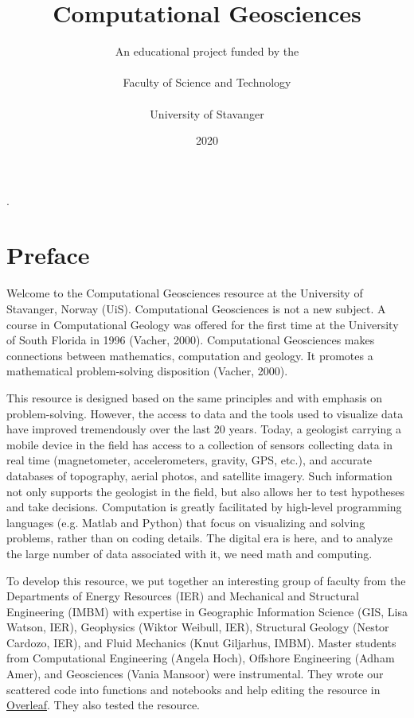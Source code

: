 \documentclass[a4paper , 12pt]{book}
\begin{document}

\lstset{style=mystyle}
\lstset{language=Python,upquote=true} %
\title{Computational Geosciences}
\author{An educational project funded by the \\ \\ Faculty of Science and Technology \\ \\ University of Stavanger}
\date{2020}

\setlength{\parindent}{0pt}.
\setlength{\parskip}{1em}
\renewcommand{\baselinestretch}{1.}

\maketitle
{}

\section*{Preface}

Welcome to the Computational Geosciences resource at the University of Stavanger, Norway (UiS). Computational Geosciences is not a new subject. A course in Computational Geology was offered for the first time at the University of South Florida in 1996 (Vacher, 2000). Computational Geosciences makes connections between mathematics, computation and geology. It promotes a mathematical problem-solving disposition (Vacher, 2000). 

This resource is designed based on the same principles and with emphasis on problem-solving. However, the access to data and the tools used to visualize data have improved tremendously over the last 20 years. Today, a geologist carrying a mobile device in the field has access to a collection of sensors collecting data in real time (magnetometer, accelerometers, gravity, GPS, etc.), and accurate databases of topography, aerial photos, and satellite imagery. Such information not only supports the geologist in the field, but also allows her to test hypotheses and take decisions. Computation is greatly facilitated by high-level programming languages (e.g. Matlab and Python) that focus on visualizing and solving problems, rather than on coding details. The digital era is here, and to analyze the large number of data associated with it, we need math and computing. 

To develop this resource, we put together an interesting group of faculty from the Departments of Energy Resources (IER) and Mechanical and Structural Engineering (IMBM) with expertise in Geographic Information Science (GIS, Lisa Watson, IER), Geophysics (Wiktor Weibull, IER), Structural Geology (Nestor Cardozo, IER), and Fluid Mechanics (Knut Giljarhus, IMBM). Master students from Computational Engineering (Angela Hoch), Offshore Engineering (Adham Amer), and Geosciences (Vania Mansoor) were instrumental. They wrote our scattered code into functions and notebooks and help editing the resource in \href {www.overleaf.com}{Overleaf}. They also tested the resource. 
\end{document}
